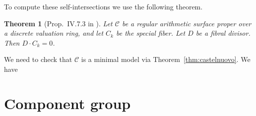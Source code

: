 \documentclass{article}
\newcommand{\scd}{\mathscr{C}}
\theoremstyle{plain}
\newtheorem{theorem}{Theorem}[section]
\theoremstyle{definition}
\theoremstyle{remark}
\begin{document}
To compute these self-intersections we use the following theorem.
\begin{theorem}[Prop.~IV.7.3 in \cite{silvermanATAEC}]\label{thm:fibral-intersect-total}
  Let $\scd$ be a regular arithmetic surface proper over a discrete valuation ring, and let $C_k$ be the special fiber. Let $D$ be a fibral divisor. Then $D \cdot C_k = 0$.
\end{theorem}

We need to check that $\scd$ is a minimal model via Theorem~\ref{thm:castelnuovo}. We have


\section{Component group}
\label{sec:component-group}





\end{document}
